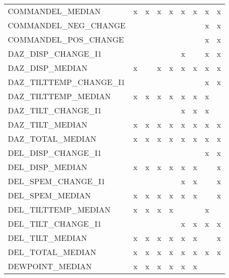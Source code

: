\begin{longtable}{lllllllll}
      COMMANDEL\_MEDIAN &      x &      x &      x &      x &      x &      x &      x &      x \\
  COMMANDEL\_NEG\_CHANGE &        &        &        &        &        &        &      x &      x \\
  COMMANDEL\_POS\_CHANGE &        &        &        &        &        &        &      x &      x \\
    DAZ\_DISP\_CHANGE\_I1 &        &        &        &        &      x &        &      x &      x \\
       DAZ\_DISP\_MEDIAN &      x &        &      x &      x &      x &      x &      x &      x \\
DAZ\_TILTTEMP\_CHANGE\_I1 &        &        &        &        &        &        &      x &      x \\
   DAZ\_TILTTEMP\_MEDIAN &      x &      x &      x &      x &      x &      x &      x &        \\
    DAZ\_TILT\_CHANGE\_I1 &        &        &        &        &      x &      x &      x &        \\
       DAZ\_TILT\_MEDIAN &      x &      x &      x &      x &      x &      x &      x &      x \\
      DAZ\_TOTAL\_MEDIAN &      x &      x &      x &      x &      x &      x &      x &      x \\
    DEL\_DISP\_CHANGE\_I1 &        &        &        &        &        &        &      x &      x \\
       DEL\_DISP\_MEDIAN &      x &      x &      x &      x &      x &      x &        &      x \\
    DEL\_SPEM\_CHANGE\_I1 &        &        &        &        &      x &      x &        &      x \\
       DEL\_SPEM\_MEDIAN &      x &      x &      x &      x &      x &      x &        &      x \\
   DEL\_TILTTEMP\_MEDIAN &      x &      x &      x &      x &        &        &      x &        \\
    DEL\_TILT\_CHANGE\_I1 &        &        &        &        &      x &      x &      x &      x \\
       DEL\_TILT\_MEDIAN &      x &      x &      x &      x &      x &      x &        &      x \\
      DEL\_TOTAL\_MEDIAN &      x &      x &      x &      x &      x &      x &      x &      x \\
       DEWPOINT\_MEDIAN &      x &      x &      x &      x &      x &      x &        &        \\

\end{longtable}
